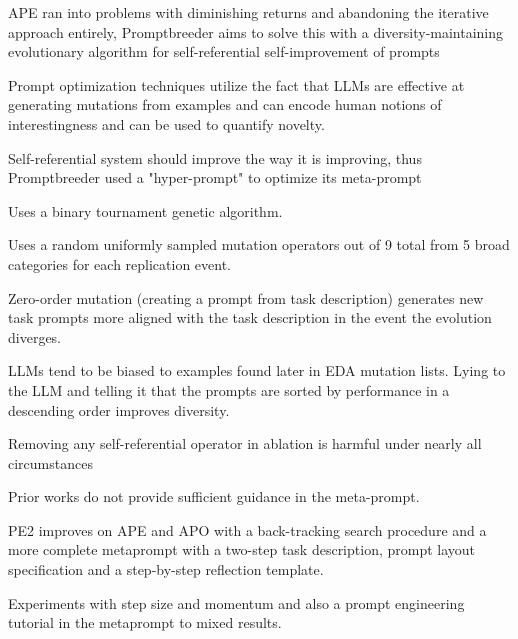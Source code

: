 APE \cite{zhou2023largelanguagemodelshumanlevel} ran into problems with diminishing returns and abandoning the iterative approach entirely, Promptbreeder aims to solve this with a diversity-maintaining evolutionary algorithm for self-referential self-improvement of prompts \cite{fernando2023promptbreederselfreferentialselfimprovementprompt}

Prompt optimization techniques utilize the fact that LLMs are effective at generating mutations from examples and can encode human notions of interestingness and can be used to quantify novelty. \cite{fernando2023promptbreederselfreferentialselfimprovementprompt}

Self-referential system should improve the way it is improving, thus Promptbreeder used a "hyper-prompt" to optimize its meta-prompt \cite{fernando2023promptbreederselfreferentialselfimprovementprompt}

Uses a binary tournament genetic algorithm. \cite{fernando2023promptbreederselfreferentialselfimprovementprompt}

Uses a random uniformly sampled mutation operators out of 9 total from 5 broad categories for each replication event. \cite{fernando2023promptbreederselfreferentialselfimprovementprompt}

Zero-order mutation (creating a prompt from task description) generates new task prompts more aligned with the task description in the event the evolution diverges.  \cite{fernando2023promptbreederselfreferentialselfimprovementprompt}

LLMs tend to be biased to examples found later in EDA mutation lists. Lying to the LLM and telling it that the prompts are sorted by performance in a descending order improves diversity.  \cite{fernando2023promptbreederselfreferentialselfimprovementprompt}

Removing any self-referential operator in ablation is harmful under nearly all circumstances \cite{fernando2023promptbreederselfreferentialselfimprovementprompt}


Prior works do not provide sufficient guidance in the meta-prompt. \cite{ye2024promptengineeringpromptengineer}

PE2 improves on APE and APO with a back-tracking search procedure and a more complete metaprompt with a two-step task description, prompt layout specification and a step-by-step reflection template. \cite{ye2024promptengineeringpromptengineer}

Experiments with step size and momentum and also a prompt engineering tutorial in the metaprompt to mixed results. \cite{ye2024promptengineeringpromptengineer}

